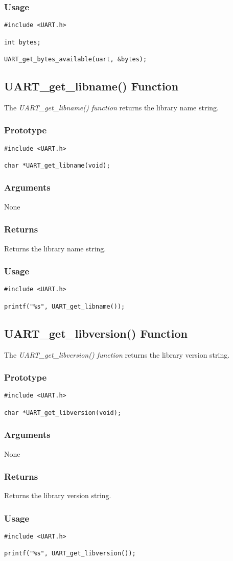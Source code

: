 \documentclass{report}
\begin{document}
\subsubsection*{Usage}
\begin{lstlisting}
#include <UART.h>

int bytes;

UART_get_bytes_available(uart, &bytes);
\end{lstlisting}
\subsection{UART\_get\_libname() Function}
The \textit{UART\_get\_libname() function} returns the library
name string.
\subsubsection*{Prototype}
\begin{lstlisting}
#include <UART.h>

char *UART_get_libname(void);
\end{lstlisting}
\subsubsection*{Arguments}
None
\subsubsection*{Returns}
Returns the library name string.
\subsubsection*{Usage}
\begin{lstlisting}
#include <UART.h>

printf("%s", UART_get_libname());
\end{lstlisting}
\subsection{UART\_get\_libversion() Function}
The \textit{UART\_get\_libversion() function} returns the library
version string.
\subsubsection*{Prototype}
\begin{lstlisting}
#include <UART.h>

char *UART_get_libversion(void);
\end{lstlisting}
\subsubsection*{Arguments}
None
\subsubsection*{Returns}
Returns the library version string.
\subsubsection*{Usage}
\begin{lstlisting}
#include <UART.h>

printf("%s", UART_get_libversion());
\end{lstlisting}
\end{document}
